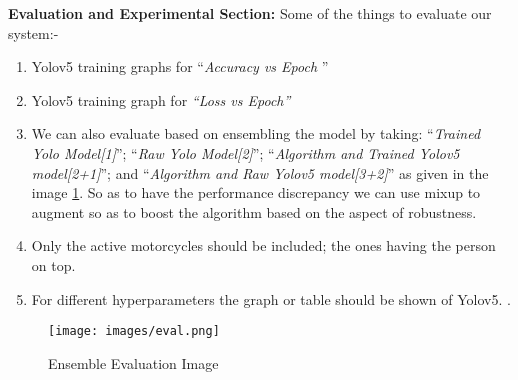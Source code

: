\textbf{Evaluation and Experimental Section:} Some of the things to evaluate our system:-
\begin{enumerate}
    \item Yolov5 training graphs for ``\textit{Accuracy vs Epoch }''
    \item Yolov5 training graph for \textit{``Loss vs Epoch''}
    \item We can also evaluate based on ensembling the model by taking: ``\textit{Trained Yolo Model[1]}''; ``\textit{Raw Yolo Model[2]}''; 
    ``\textit{Algorithm and Trained Yolov5 model[2+1]}''; and 
    ``\textit{Algorithm and Raw Yolov5 model[3+2]}'' as given in the image \ref{fig: eval_ensemble}. So as to have the performance discrepancy we can use mixup \citet{https://doi.org/10.48550/arxiv.1710.09412} to augment so as to boost the algorithm based on the aspect of robustness.
    \item Only the active motorcycles should be included; the ones having the person on top. 
    \item For different hyperparameters the graph or table should be shown of Yolov5. .
\end{enumerate}


\begin{figure}
    \centering
    \texttt{[image: images/eval.png]}
    \caption{Ensemble Evaluation Image \citet*{Shine2020AutomatedDO}}
    \label{fig: eval_ensemble}
\end{figure}
